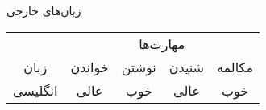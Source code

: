 \documentclass{resume} %
\begin{document}
\begin{rSection}{زبان‌های خارجی}
	
	\begin{table}[!h]
		\centering
		
		\begin{tabular}{c| c c c c}
			\toprule
			& \multicolumn{4}{c}{مهارت‌ها} \\
			 زبان & خواندن & نوشتن & شنیدن & مکالمه \\
			\midrule
			
			انگلیسی & عالی & خوب & عالی & خوب \\
			
			\bottomrule
		\end{tabular}
	\end{table}
	
\end{rSection}
%
%
%
%
%
%
%
\end{document}
